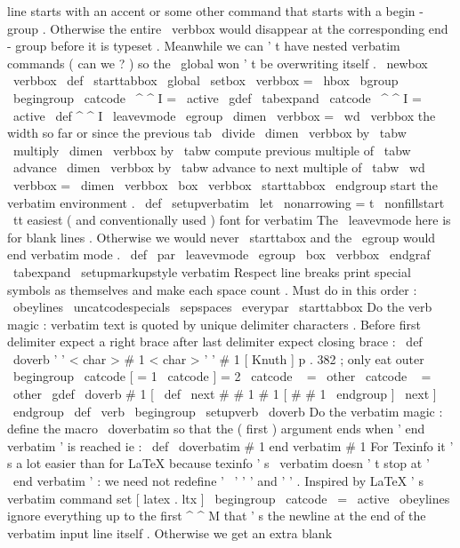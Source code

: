 {{{line
starts
with
an
accent
%
or
some
other
command
that
starts
with
a
begin
-
group
.
Otherwise
the
%
entire
\
verbbox
would
disappear
at
the
corresponding
end
-
group
before
%
it
is
typeset
.
Meanwhile
we
can
'
t
have
nested
verbatim
commands
%
(
can
we
?
)
so
the
\
global
won
'
t
be
overwriting
itself
.
\
newbox
\
verbbox
\
def
\
starttabbox
{
\
global
\
setbox
\
verbbox
=
\
hbox
\
bgroup
}
%
\
begingroup
\
catcode
\
^
^
I
=
\
active
\
gdef
\
tabexpand
{
%
\
catcode
\
^
^
I
=
\
active
\
def
^
^
I
{
\
leavevmode
\
egroup
\
dimen
\
verbbox
=
\
wd
\
verbbox
%
the
width
so
far
or
since
the
previous
tab
\
divide
\
dimen
\
verbbox
by
\
tabw
\
multiply
\
dimen
\
verbbox
by
\
tabw
%
compute
previous
multiple
of
\
tabw
\
advance
\
dimen
\
verbbox
by
\
tabw
%
advance
to
next
multiple
of
\
tabw
\
wd
\
verbbox
=
\
dimen
\
verbbox
\
box
\
verbbox
\
starttabbox
}
%
}
\
endgroup
%
start
the
verbatim
environment
.
\
def
\
setupverbatim
{
%
\
let
\
nonarrowing
=
t
%
\
nonfillstart
\
tt
%
easiest
(
and
conventionally
used
)
font
for
verbatim
%
The
\
leavevmode
here
is
for
blank
lines
.
Otherwise
we
would
%
never
\
starttabox
and
the
\
egroup
would
end
verbatim
mode
.
\
def
\
par
{
\
leavevmode
\
egroup
\
box
\
verbbox
\
endgraf
}
%
\
tabexpand
\
setupmarkupstyle
{
verbatim
}
%
%
Respect
line
breaks
%
print
special
symbols
as
themselves
and
%
make
each
space
count
.
%
Must
do
in
this
order
:
\
obeylines
\
uncatcodespecials
\
sepspaces
\
everypar
{
\
starttabbox
}
%
}
%
Do
the
verb
magic
:
verbatim
text
is
quoted
by
unique
%
delimiter
characters
.
Before
first
delimiter
expect
a
%
right
brace
after
last
delimiter
expect
closing
brace
:
%
%
\
def
\
doverb
'
{
'
<
char
>
#
1
<
char
>
'
}
'
{
#
1
}
%
%
[
Knuth
]
p
.
382
;
only
eat
outer
{
}
\
begingroup
\
catcode
[
=
1
\
catcode
]
=
2
\
catcode
\
{
=
\
other
\
catcode
\
}
=
\
other
\
gdef
\
doverb
{
#
1
[
\
def
\
next
#
#
1
#
1
}
[
#
#
1
\
endgroup
]
\
next
]
\
endgroup
%
\
def
\
verb
{
\
begingroup
\
setupverb
\
doverb
}
%
%
%
Do
the
verbatim
magic
:
define
the
macro
\
doverbatim
so
that
%
the
(
first
)
argument
ends
when
'
end
verbatim
'
is
reached
ie
:
%
%
\
def
\
doverbatim
#
1
end
verbatim
{
#
1
}
%
%
For
Texinfo
it
'
s
a
lot
easier
than
for
LaTeX
%
because
texinfo
'
s
\
verbatim
doesn
'
t
stop
at
'
\
end
{
verbatim
}
'
:
%
we
need
not
redefine
'
\
'
'
{
'
and
'
}
'
.
%
%
Inspired
by
LaTeX
'
s
verbatim
command
set
[
latex
.
ltx
]
%
\
begingroup
\
catcode
\
=
\
active
\
obeylines
%
%
ignore
everything
up
to
the
first
^
^
M
that
'
s
the
newline
at
the
end
%
of
the
verbatim
input
line
itself
.
Otherwise
we
get
an
extra
blank
}}}
